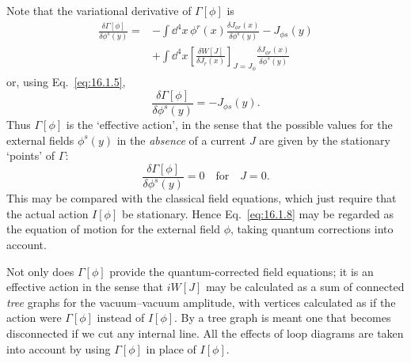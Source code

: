 Note that the variational derivative of $\Gamma[\phi]$ is
\begin{align*}
\frac{\delta\Gamma[\phi]}{\delta\phi^s(y)}
={}&-\int \dd^4x\,\phi^r(x)\frac{\delta J_{\phi r}(x)}{\delta\phi^s(y)}-J_{\phi s}(y)\\
&+\int \dd^4x\left[\frac{\delta W[J]}{\delta J_r(x)}\right]_{J=J_\phi}
\frac{\delta J_{\phi r}(x)}{\delta\phi^s(y)}
\end{align*}
or, using Eq.\ \eqref{eq:16.1.5},
\begin{equation}
\frac{\delta\Gamma[\phi]}{\delta\phi^s(y)}=-J_{\phi s}(y).
\label{eq:16.1.7}
\end{equation}
Thus $\Gamma[\phi]$ is the `effective action', in the sense that the possible values for
the external fields $\phi^s(y)$ in the \emph{absence} of a current $J$ are given by the
stationary `points' of $\Gamma$:
\begin{equation}
\frac{\delta\Gamma[\phi]}{\delta\phi^s(y)}=0\quad\text{for}\quad J=0.
\label{eq:16.1.8}
\end{equation}
This may be compared with the classical field equations, which just
require that the actual action $I[\phi]$ be stationary. Hence Eq.\ \eqref{eq:16.1.8} may
be regarded as the equation of motion for the external field $\phi$, taking
quantum corrections into account.

Not only does $\Gamma[\phi]$ provide the quantum-corrected field equations; it
is an effective action in the sense that $iW[J]$ may be calculated as a sum
of connected \emph{tree} graphs for the vacuum--vacuum amplitude, with vertices
calculated as if the action were $\Gamma[\phi]$ instead of $I[\phi]$. By a tree graph is
meant one that becomes disconnected if we cut any internal line. All the
effects of loop diagrams are taken into account by using $\Gamma[\phi]$ in place of
$I[\phi]$.

